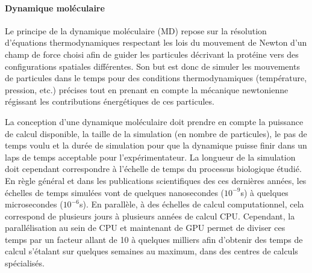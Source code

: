 \paragraph{Dynamique moléculaire}

Le principe de la dynamique moléculaire (MD) repose sur la résolution d'équations thermodynamiques respectant les lois du mouvement de Newton d'un champ de force choisi afin de guider les particules décrivant la protéine vers des configurations spatiales différentes. Son but est donc de simuler les mouvements de particules dans le temps pour des conditions thermodynamiques (température, pression, etc.) précises tout en prenant en compte la mécanique newtonienne régissant les contributions énergétiques de ces particules.

La conception d'une dynamique moléculaire doit prendre en compte la puissance de calcul disponible, la taille de la simulation (en nombre de particules), le pas de temps voulu et la durée de simulation pour que la dynamique puisse finir dans un laps de temps acceptable pour l'expérimentateur. La longueur de la simulation doit cependant correspondre à l'échelle de temps du processus biologique étudié. En règle général et dans les publications scientifiques des ces dernières années, les échelles de temps simulées vont de quelques nanosecondes ($10^{-9}$s) à quelques microsecondes ($10^{-6}$s). En parallèle, à des échelles de calcul computationnel, cela correspond de plusieurs jours à plusieurs années de calcul CPU. Cependant, la parallélisation au sein de CPU et maintenant de GPU permet de diviser ces temps par un facteur allant de 10 à quelques milliers afin d'obtenir des temps de calcul s'étalant sur quelques semaines au maximum, dans des centres de calculs spécialisés.

